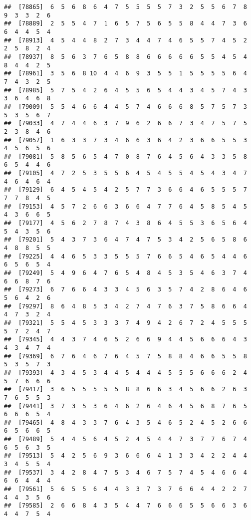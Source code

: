\documentclass[
]{book}
\begin{document}
\begin{verbatim}
##  [78865]  6  5  6  8  6  4  7  5  5  5  5  7  3  2  5  5  6  7  8  9  3  3  2  6
##  [78889]  2  5  5  4  7  1  6  5  7  5  6  5  5  8  4  4  7  3  6  6  4  4  5  4
##  [78913]  4  5  4  4  8  2  7  3  4  4  7  4  6  5  5  7  4  5  2  2  5  8  2  4
##  [78937]  8  5  6  3  7  6  5  8  8  6  6  6  6  6  5  5  4  5  4  8  4  4  2  5
##  [78961]  3  5  6  8 10  4  4  6  9  3  5  5  1  5  5  5  5  6  4  7  4  3  2  5
##  [78985]  5  7  5  4  2  6  4  5  5  6  5  4  4  3  4  5  7  4  3  3  6  4  6  8
##  [79009]  5  5  4  6  6  4  4  5  7  4  6  6  6  8  5  7  5  7  3  5  3  5  6  7
##  [79033]  4  7  4  4  6  3  7  9  6  2  6  6  7  3  4  7  5  7  5  2  3  8  4  6
##  [79057]  1  6  3  3  7  3  4  6  6  3  6  4  2  3  6  6  5  5  3  4  5  6  5  6
##  [79081]  5  8  5  6  5  4  7  0  8  7  6  4  5  6  4  3  3  5  8  6  5  4  4  6
##  [79105]  4  7  2  5  3  5  5  6  4  5  4  5  5  4  5  4  3  4  7  4  6  4  6  4
##  [79129]  6  4  5  4  5  4  2  5  7  7  3  6  6  4  6  5  5  5  7  7  7  8  4  5
##  [79153]  4  5  7  2  6  6  3  6  6  4  7  7  6  4  5  8  5  4  5  4  3  6  6  5
##  [79177]  4  5  6  2  7  8  7  4  3  8  6  4  5  5  3  6  5  6  4  5  4  3  5  6
##  [79201]  5  4  3  7  3  6  4  7  4  7  5  3  4  2  5  6  5  8  6  4  8  8  5  5
##  [79225]  4  4  6  5  3  3  5  5  5  7  6  6  5  4  6  5  4  4  6  6  5  6  5  4
##  [79249]  5  4  9  6  4  7  6  5  4  8  4  5  3  5  4  6  3  7  4  6  6  8  7  6
##  [79273]  6  7  6  6  4  3  3  4  5  6  3  5  7  4  2  8  6  4  6  5  6  4  2  6
##  [79297]  8  6  4  8  5  3  4  2  7  4  7  6  3  7  5  8  6  6  4  4  7  3  2  4
##  [79321]  5  5  4  5  3  3  3  7  4  9  4  2  6  7  2  4  5  5  5  5  7  2  4  7
##  [79345]  4  4  3  7  4  6  5  2  6  6  9  4  4  5  6  6  6  4  3  4  3  4  7  4
##  [79369]  6  7  6  4  6  7  6  4  5  7  5  8  8  4  6  6  5  5  8  5  3  5  7  3
##  [79393]  4  3  4  5  3  4  4  5  4  4  4  5  5  5  6  6  6  2  4  5  7  6  6  6
##  [79417]  3  6  5  5  5  5  5  8  8  6  6  3  4  5  6  6  2  6  3  7  6  5  5  3
##  [79441]  3  7  3  5  3  6  4  6  2  6  4  6  4  5  6  8  7  6  5  6  6  6  5  4
##  [79465]  4  8  4  3  3  7  6  4  3  5  4  6  5  2  4  5  2  6  6  6  5  6  6  5
##  [79489]  5  4  4  5  6  4  5  2  4  5  4  4  7  3  7  7  6  7  4  6  5  6  3  5
##  [79513]  5  4  2  5  6  9  3  6  6  6  4  1  3  3  4  2  2  4  4  3  4  5  5  4
##  [79537]  3  4  2  8  4  7  5  3  4  6  7  5  7  4  5  4  6  6  4  6  6  4  4  4
##  [79561]  5  6  5  5  6  4  4  3  3  7  3  7  6  6  4  4  2  2  7  4  4  3  5  6
##  [79585]  2  6  6  8  4  3  5  4  4  7  6  6  6  5  5  6  6  3  6  4  4  7  5  4

\end{verbatim}
\end{document}
